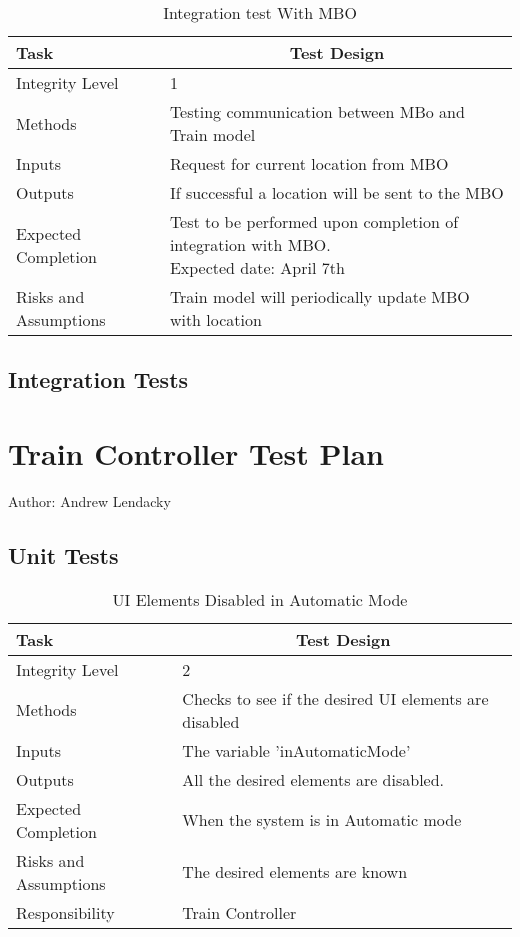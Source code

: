 \documentclass[]{article}
\begin{document}
	\begin{table}[H]
		\centering
		\caption{Integration test With MBO}
		\begin{tabular}{|l|l|}
			\hline
			Task & \multicolumn{1}{c|}{Test Design} \\ \hline
			Integrity Level & 1 \\ \hline
			Methods & Testing communication between MBo and Train model \\ \hline
			Inputs & Request for current location from MBO\\ \hline
			Outputs & If successful a location will be sent to the MBO \\ \hline
			Expected Completion & \parbox[t]{10cm}{Test to be performed upon completion of integration with MBO.\\ Expected date: April 7th}\\ \hline
			Risks and Assumptions & Train model will periodically update MBO with location\\ \hline
		\end{tabular}
	\end{table}
\subsection{Integration Tests}

\section{Train Controller Test Plan}
Author: Andrew Lendacky
\subsection{Unit Tests}

\begin{table}[H]
	\centering
	\caption{UI Elements Disabled in Automatic Mode}
	\begin{tabular}{|l|l|}
		\hline
		Task & \multicolumn{1}{c|}{Test Design} \\ \hline
		Integrity Level & 2 \\ \hline
		Methods & Checks to see if the desired UI elements are disabled\\ \hline
		Inputs & The variable 'inAutomaticMode'\\ \hline
		Outputs & All the desired elements are disabled. \\ \hline
		Expected Completion & When the system is in Automatic mode\\ \hline
		Risks and Assumptions & The desired elements are known\\ \hline
		Responsibility & Train Controller\\ \hline
	\end{tabular}
\end{table}
\end{document}

